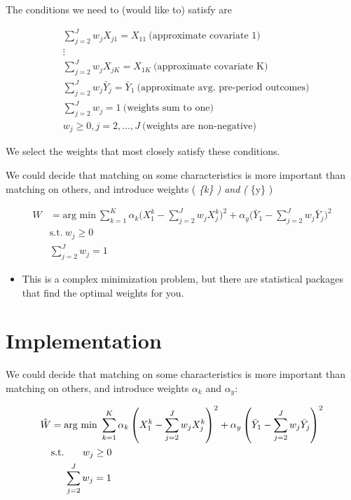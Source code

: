 \documentclass[
  letterpaper,
  DIV=11,
  numbers=noendperiod]{scrreprt}
\providecommand{\tightlist}{%
  \setlength{\itemsep}{0pt}\setlength{\parskip}{0pt}}\usepackage{longtable,booktabs,array}
\theoremstyle{definition}
\theoremstyle{remark}
\begin{document}

The conditions we need to (would like to) satisfy are

\[
\begin{aligned}
&\sum_{j=2}^{J} w_{j} X_{j1} = X_{11}\ \text{(approximate covariate 1)} \\
&\vdots \\
&\sum_{j=2}^{J} w_{j} X_{jK} = X_{1K}\ \text{(approximate covariate K)} \\
&\sum_{j=2}^{J} w_{j} \bar{Y}_{j} = \bar{Y}_{1}\ \text{(approximate avg. pre-period outcomes)} \\
&\sum_{j=2}^{J} w_{j} = 1\ \text{(weights sum to one)} \\
&w_{j} \geq 0, j= 2, \ldots, J\ \text{(weights are non-negative)}
\end{aligned}
\]

We select the weights that most closely satisfy these conditions.

We could decide that matching on some characteristics is more important
than matching on others, and introduce weights ( \alpha\emph{\{k\} ) and
( \alpha}\{y\} )

\[
\begin{aligned}
\hat{W} &= \text{arg min}\ \sum_{k=1}^{K} \alpha_{k} \bigg( X_{1}^{k} - \sum_{j=2}^{J} w_{j} X_{j}^{k} \bigg)^2 + \alpha_{y} \bigg( \bar{Y}_{1}  - \sum_{j=2}^{J} w_{j} \bar{Y}_{j} \bigg)^2 \\
&\text{s.t.}\ w_{j} \geq 0 \\
&\sum_{j=2}^{J} w_{j} = 1
\end{aligned}
\]

\begin{itemize}
\tightlist
\item
  This is a complex minimization problem, but there are statistical
  packages that find the optimal weights for you.
\end{itemize}

\section*{Implementation}\label{implementation-1}


We could decide that matching on some characteristics is more important
than matching on others, and introduce weights \(\alpha_{k}\) and
\(\alpha_{y}\):

\[
\begin{aligned}
\hat{W} &= \text{arg min}\ \sum_{k=1}^{K} \alpha_{k} \left( X_{1}^{k} - \sum_{j=2}^{J} w_{j} X_{j}^{k} \right)^2 + \alpha_{y} \left( \bar{Y}_{1}  - \sum_{j=2}^{J} w_{j} \bar{Y}_{j} \right)^2 \\
&\text{s.t.}\ \hspace{5.5mm}  w_{j} \geq 0 \\
& \hspace{5mm} \sum_{j=2}^{J} w_{j} = 1
\end{aligned}
\]
\end{document}
